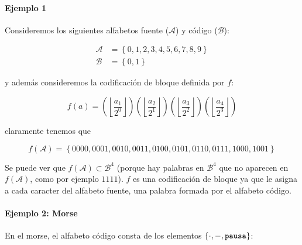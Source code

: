 \paragraph{Ejemplo 1}\label{ejemplo-1-codigos}

Consideremos los siguientes alfabetos fuente (\(\mathcal{A}\)) y código
(\(\mathcal{B}\)):


\begin{align*}
\mathcal{A} &=\left\{0,1,2,3,4,5,6,7,8,9\right\}\\
\mathcal{B} &=\left\{0,1\right\}
\end{align*}


y además consideremos la codificación de bloque definida por \(f\):

\[
f(a) = \left(\left\lfloor\frac{a_1}{2^0}\right\rfloor\right)\left(\left\lfloor\frac{a_2}{2^1}\right\rfloor\right)\left(\left\lfloor\frac{a_3}{2^2}\right\rfloor\right)\left(\left\lfloor\frac{a_4}{2^3}\right\rfloor\right)
\]

claramente tenemos que

\[
f(\mathcal{A}) = \left\{0000, 0001, 0010, 0011, 0100, 0101, 0110, 0111, 1000, 1001\right\}
\]

Se puede ver que \(f(\mathcal{A})\subset\mathcal{B}^4\) (porque hay
palabras en \(\mathcal{B}^4\) que no aparecen en \(f(\mathcal{A})\),
como por ejemplo \(1111\)). \(f\) es una codificación de bloque ya que
le asigna a cada caracter del alfabeto fuente, una palabra formada por
el alfabeto código.

\paragraph{Ejemplo 2: Morse}\label{ejemplo-2-morse}

En el morse, el alfabeto código consta de los elementos
\(\left\{\cdot,-,\text{\texttt{pausa}}\right\}\):

